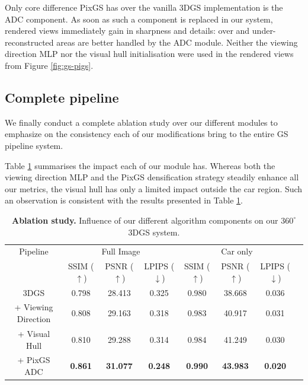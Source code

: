 Only core difference PixGS has over the vanilla 3D\ac{GS} implementation is the \ac{ADC} component. As soon as such a component is replaced in our system, rendered views immediately gain in sharpness and details: over and under-reconstructed areas are better handled by the \ac{ADC} module. Neither the viewing direction MLP nor the visual hull initialisation were used in the rendered views from Figure \ref{fig:gs-pigs}. 

\subsection{Complete pipeline}

We finally conduct a complete ablation study over our different modules to emphasize on the consistency each of our modifications bring to the entire \ac{GS} pipeline system. 

Table \ref{table:gs-abaltion} summarises the impact each of our module has. Whereas both the viewing direction \ac{MLP} and the PixGS densification strategy steadily enhance all our metrics, the visual hull has only a limited impact outside the car region. Such an observation is consistent with the results presented in Table \ref{table:gs-abaltion}. 

\begin{table}[htp!]
  \caption{\textbf{Ablation study.} Influence of our different algorithm components on our $360^{\circ}$ 3D\ac{GS} system.}
  \label{table:gs-abaltion}
  \begin{adjustbox}{width=\linewidth}
  \begin{tabular}[h]{c||ccccccc}
  \hline
   Pipeline & \multicolumn{3}{c}{Full Image} & \multicolumn{3}{c}{Car only} \\
   &  SSIM ($\uparrow$) & PSNR ($\uparrow$) & LPIPS ($\downarrow$) & SSIM ($\uparrow$) & PSNR ($\uparrow$) & LPIPS ($\downarrow$)\\
  \hline
  3D\ac{GS} \citep{kerbl20233d}  & 0.798  & 28.413 & 0.325 & 0.980 & 38.668 & 0.036 \\
  + Viewing Direction & 0.808 & 29.163 & 0.318 & 0.983 & 40.917  & 0.031 \\
  + Visual Hull & 0.810 & 29.288 & 0.314 & 0.984 &41.249  & 0.030 \\
  + PixGS \ac{ADC} & \textbf{0.861} & \textbf{31.077} & \textbf{0.248} & \textbf{0.990} & \textbf{43.983} & \textbf{0.020} \\
  \hline 
  \end{tabular}
  \end{adjustbox}
  \end{table}

